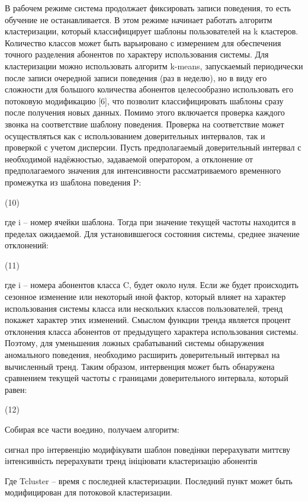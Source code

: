 В рабочем режиме система продолжает фиксировать записи поведения, то есть обучение не останавливается. В этом режиме начинает работать алгоритм кластеризации, который классифицирует шаблоны пользователей на k кластеров. Количество классов может быть варьировано с измерением для обеспечения точного разделения абонентов по характеру использования системы. Для кластеризации можно использовать алгоритм k-means, запускаемый периодически после записи очередной записи поведения (раз в неделю), но в виду его сложности для большого количества абонентов целесообразно использовать его потоковую модификацию [6], что позволит классифицировать шаблоны сразу после получения новых данных.
Помимо этого включается проверка каждого звонка на соответствие шаблону поведения. Проверка на соответствие может осуществляться как с использованием доверительных интервалов, так и проверкой с учетом дисперсии. Пусть предполагаемый доверительный интервал   с необходимой надёжностью, задаваемой оператором, а отклонение от предполагаемого значения для интенсивности рассматриваемого временного промежутка  из шаблона поведения P: 

(10)

где i – номер ячейки шаблона. Тогда при  значение текущей частоты находится в пределах ожидаемой.
Для установившегося состояния системы, среднее значение отклонений:

(11)

где i – номера абонентов класса C, будет около нуля. Если же будет происходить сезонное изменение или некоторый иной фактор, который влияет на характер использования системы класса или нескольких классов пользователей, тренд покажет характер этих изменений.
Смыслом функции тренда является процент отклонения класса абонентов от предыдущего характера использования системы. Поэтому, для уменьшения ложных срабатываний системы обнаружения аномального поведения, необходимо расширить доверительный интервал на вычисленный тренд.
Таким образом, интервенция может быть обнаружена сравнением текущей частоты с границами доверительного интервала, который равен:

(12)

Собирая все части воедино, получаем алгоритм:

\begin{algorithm}[H]
\SetAlgoLined

   {
     {
      сигнал про інтервенцію\;
    }
   модифікувати шаблон поведінки\;
   перерахувати миттєву інтенсивність\;
   перерахувати тренд\;
    {
    ініціювати кластеризацію абонентів\;
   }
  }

\end{algorithm}
Где Tcluster – время с последней кластеризации. 
Последний пункт может быть модифицирован для потоковой кластеризации.


